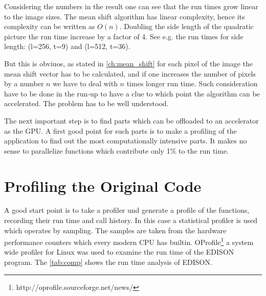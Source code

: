 Considering the numbers in the result one can see that the run times grow 
linear to the image sizes. The mean shift algorithm has linear complexity, 
hence its complexity can be written as $O(n)$. Doubling the side length of 
the quadratic picture the run time increase by a factor of 4. See e.g.
the run times for side length: (l=256, t=9) and (l=512, t=36). 

But this is obviuos, as stated in \autoref{ch:mean_shift} for each pixel of the
image the mean shift vector has to be calculated, and if one increases the number
of pixels by a number $n$ we have to deal with $n$ times longer run time. Such 
consideration have to be done in the run-up to have a clue to which point the 
algorithm can be accelerated. The problem has to be well understood. 

The next important step is to find parts which can be offloaded to an accelerator
as the \gls{GPU}. A first good point for such parts is to make a profiling of 
the application to find out the most computationally intensive parts. It makes no
sense to parallelize functions which contribute only 1\% to the run time. 

\section{Profiling the Original Code} %
\label{sec:run_time_analysis_of_the_original_code}
A good start point is to take a profiler und generate a profile of the
functions, recording their run time and call history. In this case a statistical
profiler is used which operates by sampling. The samples are taken from the
hardware performance counters which every modern \gls{CPU} has builtin.
OProfile\footnote{http://oprofile.sourceforge.net/news/} a system wide profiler
for Linux was used to examine the run time of the \gls{EDISON} program. The
\autoref{tab:comp} shows the run time analysis of \gls{EDISON}.

